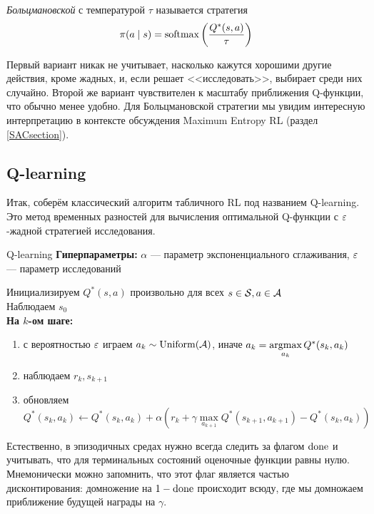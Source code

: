 \begin{definition}
\emph{Больцмановской} с температурой $\tau$ называется стратегия
\begin{equation}\label{boltzman}
\pi(a \mid s) = \operatorname*{softmax} \left( \frac{Q^*(s, a)}{\tau} \right)
\end{equation}
\end{definition}

Первый вариант никак не учитывает, насколько кажутся хорошими другие действия, кроме жадных, и, если решает <<исследовать>>, выбирает среди них случайно. Второй же вариант чувствителен к масштабу приближения Q-функции, что обычно менее удобно. Для Больцмановской стратегии мы увидим интересную интерпретацию в контексте обсуждения Maximum Entropy RL (раздел \ref{SACsection}).

\subsection{Q-learning}

Итак, соберём классический алгоритм табличного RL под названием Q-learning. Это метод временных разностей для вычисления оптимальной Q-функции с $\varepsilon$-жадной стратегией исследования.

\begin{algorithm}[label=alg:qlearning]{Q-learning}
\textbf{Гиперпараметры:} $\alpha$ --- параметр экспоненциального сглаживания, $\varepsilon$ --- параметр исследований

\vspace{0.3cm}
Инициализируем $Q^*(s, a)$ произвольно для всех $s \in \mathcal{S}, a \in \mathcal{A}$ \\
Наблюдаем $s_0$ \\ 
\textbf{На $k$-ом шаге:}
\begin{enumerate}
    \item с вероятностью $\varepsilon$ играем $a_k \sim \operatorname{Uniform}(\mathcal{A})$, иначе $a_k = \mathop{\mathrm{argmax}}\limits_{a_k} Q^*(s_k, a_k)$
    \item наблюдаем $r_k, s_{k+1}$
    \item обновляем $Q^*(s_k, a_k) \leftarrow Q^*(s_k, a_k) + \alpha \left( r_k + \gamma \max\limits_{a_{k+1}} Q^*(s_{k+1}, a_{k+1}) - Q^*(s_k, a_k) \right)$
\end{enumerate}
\end{algorithm}

\begin{remark}
Естественно, в эпизодичных средах нужно всегда следить за флагом $\mathrm{done}$ и учитывать, что для терминальных состояний оценочные функции равны нулю. Мнемонически можно запомнить, что этот флаг является частью дисконтирования: домножение на $1 \HM- \done$ происходит всюду, где мы домножаем приближение будущей награды на $\gamma$.
\end{remark}

